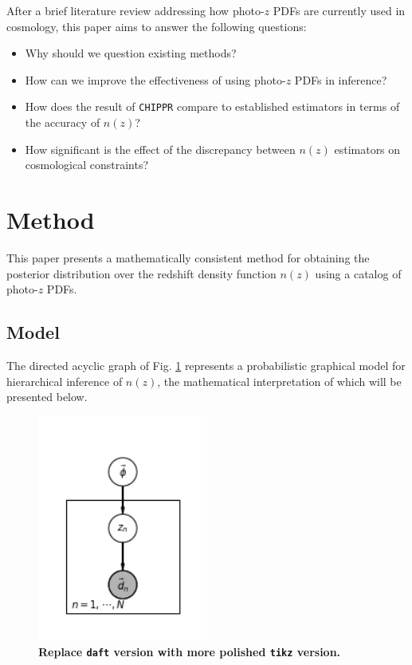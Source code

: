 \documentclass[iop]{emulateapj}
\newcommand{\chippr}{\texttt{CHIPPR} }
\begin{document}
After a brief literature review addressing how photo-$z$ PDFs are currently 
used in cosmology, this paper aims to answer the following questions:

\begin{itemize}
	\item Why should we question existing methods?
	\item How can we improve the effectiveness of using photo-$z$ PDFs in 
inference?
	\item How does the result of \chippr compare to established estimators 
in terms of the accuracy of $n(z)$?
	\item How significant is the effect of the discrepancy between $n(z)$ 
estimators on cosmological constraints?
\end{itemize}

\section{Method}
\label{sec:method}

This paper presents a mathematically consistent method for obtaining the 
posterior distribution over the redshift density function $n(z)$ using a 
catalog of photo-$z$ PDFs.

\subsection{Model}
\label{sec:model}

The directed acyclic graph of Fig. \ref{fig:pgm} represents a probabilistic 
graphical model for hierarchical inference of $n(z)$, the mathematical 
interpretation of which will be presented below.

\begin{figure}
	\begin{center}
		\includegraphics[width=0.5\textwidth]{pgm.png}
		\caption{\textbf{Replace \texttt{daft} version with more 
polished \texttt{tikz} version.}}
	\label{fig:pgm}
	\end{center}
\end{figure}
\end{document}
